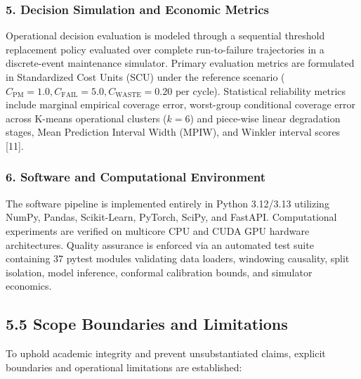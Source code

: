 \documentclass[12pt,a4paper]{article}
\begin{document}
\subsubsection*{5. Decision Simulation and Economic Metrics}
Operational decision evaluation is modeled through a sequential threshold replacement policy evaluated over complete run-to-failure trajectories in a discrete-event maintenance simulator. Primary evaluation metrics are formulated in Standardized Cost Units (SCU) under the reference scenario ($C_{\text{PM}} = 1.0, C_{\text{FAIL}} = 5.0, C_{\text{WASTE}} = 0.20$ per cycle). Statistical reliability metrics include marginal empirical coverage error, worst-group conditional coverage error across K-means operational clusters ($k = 6$) and piece-wise linear degradation stages, Mean Prediction Interval Width (MPIW), and Winkler interval scores [11].

\subsubsection*{6. Software and Computational Environment}
The software pipeline is implemented entirely in Python 3.12/3.13 utilizing NumPy, Pandas, Scikit-Learn, PyTorch, SciPy, and FastAPI. Computational experiments are verified on multicore CPU and CUDA GPU hardware architectures. Quality assurance is enforced via an automated test suite containing 37 pytest modules validating data loaders, windowing causality, split isolation, model inference, conformal calibration bounds, and simulator economics.

\subsection*{5.5 Scope Boundaries and Limitations}
To uphold academic integrity and prevent unsubstantiated claims, explicit boundaries and operational limitations are established:
\end{document}
